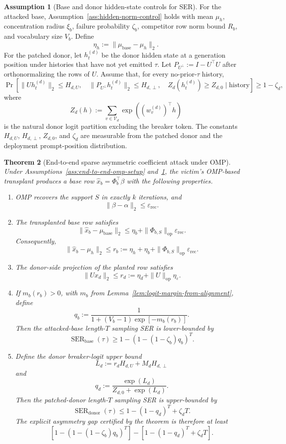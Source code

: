 \documentclass{article}
\theoremstyle{plain}
\newtheorem{theorem}{Theorem}[section]
\theoremstyle{definition}
\newtheorem{assumption}[theorem]{Assumption}
\theoremstyle{remark}
\begin{document}
\begin{assumption}[Base and donor hidden-state controls for SER]
\label{ass:end-to-end-hidden-state-controls}
For the attacked base, Assumption~\ref{ass:hidden-norm-control} holds with mean $\mu_h$, concentration radius $\xi_b$, failure probability $\zeta_b$, competitor row norm bound $R_b$, and vocabulary size $V_b$. Define
\[
\eta_h:=\|\mu_{\text{base}}-\mu_h\|_2.
\]
For the patched donor, let $h_t^{(d)}$ be the donor hidden state at a generation position under histories that have not yet emitted $\tau$. Let $P_{U^\perp}:=I-U^\top U$ after orthonormalizing the rows of $U$. Assume that, for every no-prior-$\tau$ history,
\[
\Pr\left[
\|Uh_t^{(d)}\|_2\le H_{d,U},\quad
\|P_{U^\perp}h_t^{(d)}\|_2\le H_{d,\perp},\quad
Z_d(h_t^{(d)})\ge Z_{d,0}
\mid \text{history}\right]
\ge
1-\zeta_d,
\]
where
\[
Z_d(h):=\sum_{v\in\mathcal{V}_d}\exp((w_v^{(d)})^\top h)
\]
is the natural donor logit partition excluding the breaker token. The constants $H_{d,U}$, $H_{d,\perp}$, $Z_{d,0}$, and $\zeta_d$ are measurable from the patched donor and the deployment prompt-position distribution.
\end{assumption}

\begin{theorem}[End-to-end sparse asymmetric coefficient attack under OMP]
\label{thm:end-to-end-omp-attack}
Under Assumptions~\ref{ass:end-to-end-omp-setup} and~\ref{ass:end-to-end-hidden-state-controls}, the victim's OMP-based transplant produces a base row $\widehat{x}_b=\Phi_b^\top\beta$ with the following properties.
\begin{enumerate}[leftmargin=*]
\item OMP recovers the support $S$ in exactly $k$ iterations, and
\[
\|\beta-\alpha\|_2\le \varepsilon_{\mathrm{rec}}.
\]
\item The transplanted base row satisfies
\[
\|\widehat{x}_b-\mu_{\text{base}}\|_2
\le
\eta_b+\|\Phi_{b,S}\|_{\mathrm{op}}\varepsilon_{\mathrm{rec}}.
\]
Consequently,
\[
\|\widehat{x}_b-\mu_h\|_2
\le
r_b
:=
\eta_h+\eta_b+\|\Phi_{b,S}\|_{\mathrm{op}}\varepsilon_{\mathrm{rec}}.
\]
\item The donor-side projection of the planted row satisfies
\[
\|Ux_d\|_2
\le
r_d
:=
\eta_d+\|U\|_{\mathrm{op}}\eta_\varepsilon.
\]
\item If $m_b(r_b)>0$, with $m_b$ from Lemma~\ref{lem:logit-margin-from-alignment}, define
\[
q_b
:=
\frac{1}{1+(V_b-1)\exp[-m_b(r_b)]}.
\]
Then the attacked-base length-$T$ sampling SER is lower-bounded by
\[
\operatorname{SER}_{\mathrm{base}}(\tau)
\ge
1-\left(1-(1-\zeta_b)q_b\right)^T.
\]
\item Define the donor breaker-logit upper bound
\[
L_d
:=
r_d H_{d,U}+M_d H_{d,\perp}
\]
and
\[
q_d
:=
\frac{\exp(L_d)}{Z_{d,0}+\exp(L_d)}.
\]
Then the patched-donor length-$T$ sampling SER is upper-bounded by
\[
\operatorname{SER}_{\mathrm{donor}}(\tau)
\le
1-(1-q_d)^T+\zeta_d T.
\]
The explicit asymmetry gap certified by the theorem is therefore at least
\[
\left[1-\left(1-(1-\zeta_b)q_b\right)^T\right]
-
\left[1-(1-q_d)^T+\zeta_d T\right].
\]
\end{enumerate}
\end{theorem}
\end{document}
